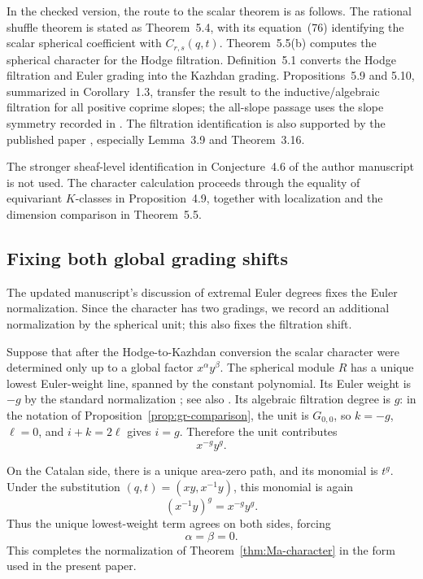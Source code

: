 \documentclass[11pt]{article}
\begin{document}
In the checked version, the route to the scalar theorem is as follows.
The rational shuffle theorem is stated as Theorem~5.4, with
its equation~(76) identifying the scalar spherical coefficient with
$C_{r,s}(q,t)$.  Theorem~5.5(b) computes the spherical character for
the Hodge filtration.  Definition~5.1 converts the Hodge filtration
and Euler grading into the Kazhdan grading.  Propositions~5.9 and 5.10,
summarized in Corollary~1.3, transfer the result to the
inductive/algebraic filtration for all positive coprime slopes; the
all-slope passage uses the slope symmetry recorded in
\cite[Corollary~1.1]{GorskyArc}.  The filtration identification is also
supported by the published paper
\cite{MaFiltrations}, especially Lemma~3.9 and Theorem~3.16.

The stronger sheaf-level identification in Conjecture~4.6 of the
author manuscript is not used.  The character calculation proceeds
through the equality of equivariant $K$-classes in Proposition~4.9,
together with localization and the dimension comparison in
Theorem~5.5.

\subsection{Fixing both global grading shifts}

The updated manuscript's discussion of extremal Euler degrees fixes
the Euler normalization.  Since the character has two gradings, we
record an additional normalization by the spherical unit; this also
fixes the filtration shift.

Suppose that after the Hodge-to-Kazhdan conversion the scalar character
were determined only up to a global factor $x^\alpha y^\beta$.  The
spherical module $R$ has a unique lowest Euler-weight line, spanned by
the constant polynomial.  Its Euler weight is $-g$ by the standard
normalization \cite[Theorem~1.10]{BEG}; see also
\cite[Section~2.2.3]{GORS}.  Its algebraic filtration degree is $g$:
in the notation of Proposition~\ref{prop:gr-comparison}, the unit is
$G_{0,0}$, so $k=-g$, $\ell=0$, and $i+k=2\ell$ gives $i=g$.
Therefore the unit contributes
\[
 x^{-g}y^g.
\]

On the Catalan side, there is a unique area-zero path, and its monomial
is $t^g$.  Under the substitution $(q,t)=(xy,x^{-1}y)$, this monomial
is again
\[
 (x^{-1}y)^g=x^{-g}y^g.
\]
Thus the unique lowest-weight term agrees on both sides, forcing
\[
 \alpha=\beta=0.
\]
This completes the normalization of
Theorem~\ref{thm:Ma-character} in the form used in the present paper.
\end{document}
